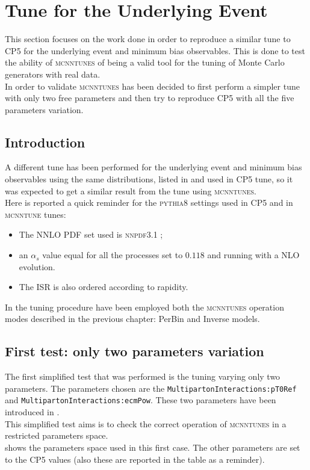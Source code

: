 \chapter{Tune for the Underlying Event}
\label{chap:OurTunefortheUnderlyingEvent}

This section focuses on the work done in order to reproduce a similar tune to CP5 for the underlying event and minimum bias observables. This is done to test the ability of \textsc{mcnntunes} of being a valid tool for the tuning of Monte Carlo generators with real data. 
\\
In order to validate \textsc{mcnntunes} has been decided to first perform a simpler tune with only two free parameters and then try to reproduce CP5 \cite{CPtunes} with all the five parameters variation.


\section{Introduction}

A different tune has been performed for the underlying event and minimum bias observables using the same distributions, listed in  and used in CP5 tune, so it was expected to get a similar result from the tune using \textsc{mcnntunes}.
\\
Here is reported a quick reminder for the \textsc{pythia8} settings used in CP5 and in \textsc{mcnntune} tunes:
\begin{itemize}
	\item The NNLO PDF set used is \textsc{nnpdf}3.1 \cite{NNPDF:2017mvq}; 
	\item an $\alpha_s$ value equal for all the processes set to $0.118$ and running with a NLO evolution.
	\item The ISR is also ordered according to rapidity.
\end{itemize}
In the tuning procedure have been employed both the \textsc{mcnntunes} operation modes described in the previous chapter: PerBin and Inverse models.

\section{First test: only two parameters variation}

The first simplified test that was performed is the tuning varying only two parameters. The parameters chosen are the \texttt{Multiparton}\-\texttt{Interactions:}\-\texttt{pT0Ref} and 
\texttt{Multiparton}\-\texttt{Interactions:}\-\texttt{ecmPow}. These two parameters have been introduced in .
\\
This simplified test aims is to check the correct operation of \textsc{mcnntunes}  in a restricted parameters space.%
\\
 shows the parameters space used in this first case. The other parameters are set to the CP5 values (also these are reported in the table as a reminder).

